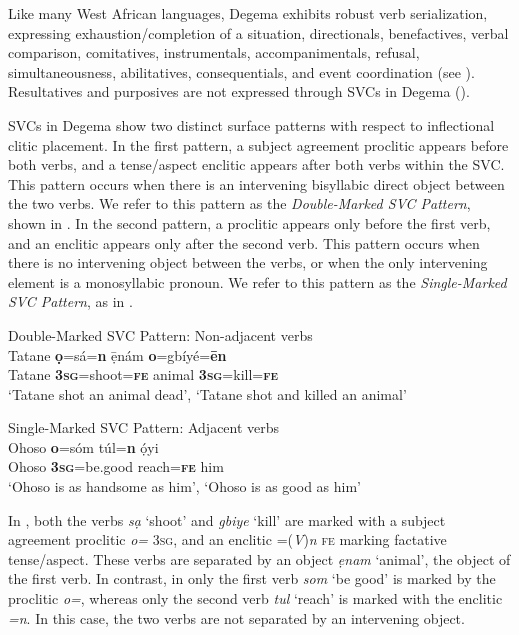 \documentclass[output=paper]{langsci/langscibook}
\begin{document}
Like many West African languages, Degema exhibits robust verb serialization, expressing exhaustion/completion of a situation, directionals, benefactives, verbal comparison, comitatives, instrumentals, accompanimentals, refusal, simultaneousness, abilitatives, consequentials, and event coordination (see \citealt{Kari2003a}). Resultatives and purposives are not expressed through SVCs in Degema (\citealt[59--60, 206]{Kari2004}).

SVCs in Degema show two distinct surface patterns with respect to inflectional clitic placement. In the first pattern, a subject agreement proclitic appears before both verbs, and a tense/aspect enclitic appears after both verbs within the SVC. This pattern occurs when there is an intervening bisyllabic direct object between the two verbs. We refer to this pattern as the \textit{Double-Marked SVC Pattern}, shown in . In the second pattern, a proclitic appears only before the first verb, and an enclitic appears only after the second verb. This pattern occurs when there is no intervening object between the verbs, or when the only intervening element is a monosyllabic pronoun. We refer to this pattern as the \textit{Single-Marked SVC Pattern}, as in .

\ea\label{ex:rolle:9}
{Double-Marked SVC Pattern: Non-adjacent verbs}\\
\gll  Tatane  \textbf{ọ}=sá=\textbf{n}      ẹ̄nám  \textbf{o}=gbíyé=\textbf{ēn}\\
     Tatane  \textbf{3}\textbf{\textsc{sg}}=shoot=\textbf{\textsc{fe}}  animal  \textbf{3}\textbf{\textsc{sg}}=kill=\textbf{\textsc{fe}}\\
\glt ‘Tatane shot an animal dead’, ‘Tatane shot and killed an animal’
\z

\ea\label{ex:rolle:10}
{Single-Marked SVC Pattern: Adjacent verbs}\\
\gll  Ohoso   \textbf{o}=sóm       túl=\textbf{n}     ọ́yi\\
     Ohoso  \textbf{3}\textbf{\textsc{sg}}=be.good    reach=\textbf{\textsc{fe}}  him\\
\glt ‘Ohoso is as handsome as him’, ‘Ohoso is as good as him’
\z

In , both the verbs \textit{sạ} ‘shoot’ and \textit{gbiye} ‘kill’ are marked with a subject agreement proclitic \textit{o=} \textsc{3sg}, and an enclitic =(\textit{V})\textit{n} \textsc{fe} marking factative tense/aspect. These verbs are separated by an object \textit{ẹnam} ‘animal’, the object of the first verb. In contrast, in  only the first verb \textit{som} ‘be good’ is marked by the proclitic \textit{o=}, whereas only the second verb \textit{tul} ‘reach’ is marked with the enclitic \textit{=n}. In this case, the two verbs are not separated by an intervening object. 
\end{document}
